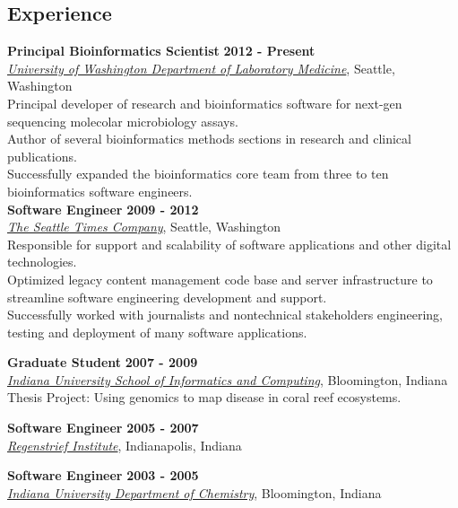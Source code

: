 \documentclass{res}
\begin{document}

\address{Seattle, WA}
\address{crosenth@gmail.com}

\begin{resume}

\section{Experience}

\textbf{Principal Bioinformatics Scientist} \hfill \textbf{2012 - Present}\\
\href{http://depts.washington.edu/labweb/}{\textit{University of Washington Department of Laboratory Medicine}},
Seattle, Washington\\
 Principal developer of research and bioinformatics software for next-gen sequencing molecolar microbiology assays.\\
 Author of several bioinformatics methods sections in research and clinical publications.\\
 Successfully expanded the bioinformatics core team from three to ten bioinformatics software engineers.\\

\textbf{Software Engineer} \hfill \textbf{2009 - 2012}\\
\href{http://www.seattletimes.com/}{\textit{The Seattle Times Company}}, Seattle, Washington\\
 Responsible for support and scalability of software applications and other digital technologies.\\
 Optimized legacy content management code base and server infrastructure to streamline software engineering development and support.\\
 Successfully worked with journalists and nontechnical stakeholders engineering, testing and deployment of many software applications.

\textbf{Graduate Student} \hfill \textbf{2007 - 2009}\\
\href{https://www.soic.indiana.edu/}{\textit{Indiana University School of Informatics and Computing}}, Bloomington, Indiana\\
Thesis Project: Using genomics to map disease in coral reef ecosystems.

\textbf{Software Engineer} \hfill \textbf{2005 - 2007}\\
\href{http://www.regenstrief.org/}{\textit{Regenstrief Institute}}, Indianapolis, Indiana

\textbf{Software Engineer} \hfill \textbf{2003 - 2005}\\
\href{http://chem.indiana.edu/}{\textit{Indiana University Department of Chemistry}}, Bloomington, Indiana


\end{resume}
\end{document}
